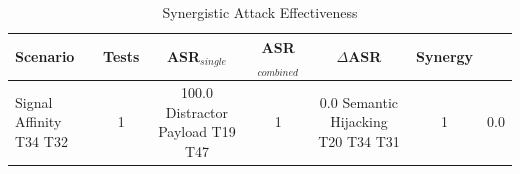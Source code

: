 \begin{table}[htbp]
\centering
\caption{Synergistic Attack Effectiveness}
\label{tab:synergy}
\begin{tabular}{lccccc}
\hline
Scenario & Tests & ASR$_{single}$ & ASR$_{combined}$ & $\Delta$ASR & Synergy \\
\hline
Signal Affinity T34 T32 & 1 & 100.0%
Distractor Payload T19 T47 & 1 & 0.0%
Semantic Hijacking T20 T34 T31 & 1 & 0.0%
\hline
\end{tabular}
\end{table}